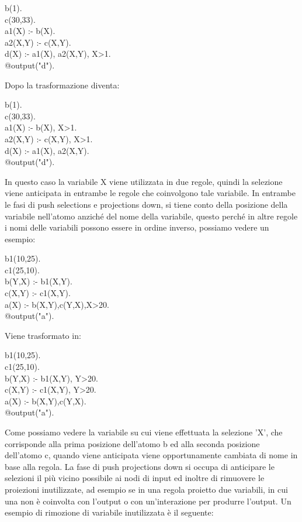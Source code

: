 \begin{algorithm}[h]
	b(1). \\
	c(30,33). \\
	a1(X) :- b(X). \\
	a2(X,Y) :- c(X,Y). \\
	d(X) :- a1(X), a2(X,Y), X>1. \\
	@output("d").
\end{algorithm}

Dopo la trasformazione diventa: 

\begin{algorithm}[h]
	b(1). \\
	c(30,33). \\
	a1(X) :- b(X), X>1. \\
	a2(X,Y) :- c(X,Y), X>1. \\
	d(X) :- a1(X), a2(X,Y). \\
	@output("d").
\end{algorithm} 

In questo caso la variabile X viene utilizzata in due regole, quindi la selezione viene anticipata in entrambe le regole che coinvolgono tale variabile. \newline
In entrambe le fasi di push selections e projections down, si tiene conto della posizione della variabile nell'atomo anziché del nome della variabile, questo perché in altre regole i nomi delle variabili possono essere in ordine inverso, possiamo vedere un esempio:

\begin{algorithm}[h]
	b1(10,25). \\
	c1(25,10). \\
	b(Y,X) :- b1(X,Y). \\
	c(X,Y) :- c1(X,Y). \\
	a(X) :- b(X,Y),c(Y,X),X>20. \\
	@output("a").
\end{algorithm}

Viene trasformato in:

\begin{algorithm}[h]
	b1(10,25). \\
	c1(25,10). \\
	b(Y,X) :- b1(X,Y), Y>20. \\
	c(X,Y) :- c1(X,Y), Y>20. \\
	a(X) :- b(X,Y),c(Y,X). \\
	@output("a").
\end{algorithm}

Come possiamo vedere la variabile su cui viene effettuata la selezione 'X', che corrisponde alla prima posizione dell'atomo b ed alla seconda posizione dell'atomo c, quando viene anticipata viene opportunamente cambiata di nome in base alla regola. \newline \newline
La fase di push projections down si occupa di anticipare le selezioni il più vicino possibile ai nodi di input ed inoltre di rimuovere le proiezioni inutilizzate, ad esempio se in una regola proietto due variabili, in cui una non è coinvolta con l'output o con un'interazione per produrre l'output. Un esempio di rimozione di variabile inutilizzata è il seguente:

